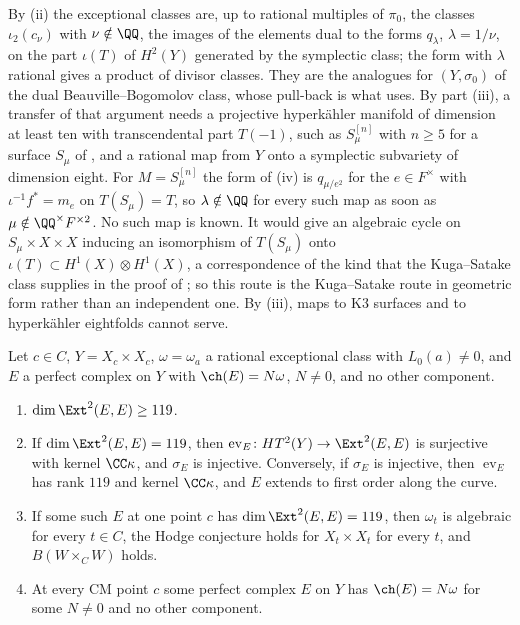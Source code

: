 \begin{remark}\label{rem:hkroute}
By (ii) the exceptional classes are, up to rational
multiples of $\pi_{0}$, the classes $\iota_{2}(c_{\nu})$ with $\nu\notin\QQ$,
the images of the elements dual to the forms $q_{\lambda}$, $\lambda=1/\nu$,
on the part $\iota(T)$ of $H^{2}(Y)$ generated by the symplectic class; the
form with $\lambda$ rational gives a product of divisor classes. They are the
analogues for $(Y,\sigma_{0})$ of the dual Beauville--Bogomolov class, whose
pull-back is what \cite{vGR26} uses. By part (iii), a transfer of that
argument needs a projective hyperk\"ahler manifold of dimension at least ten with
transcendental part $T(-1)$, such as $S_{\mu}^{[n]}$ with $n\ge5$ for a
surface $S_{\mu}$ of , and a rational map from $Y$ onto a
symplectic subvariety of dimension eight. For $M=S_{\mu}^{[n]}$ the form of
(iv) is $q_{\mu/e^{2}}$ for the $e\in F^{\times}$ with $\iota^{-1}f^{*}=m_{e}$
on $T(S_{\mu})=T$, so $\lambda\notin\QQ$ for every such map as soon as
$\mu\notin\QQ^{\times}F^{\times2}$. No such map is known. It would give an
algebraic cycle on $S_{\mu}\times X\times X$ inducing an isomorphism of
$T(S_{\mu})$ onto $\iota(T)\subset H^{1}(X)\otimes H^{1}(X)$, a correspondence
of the kind that the Kuga--Satake class supplies in the proof of
; so this route is the Kuga--Satake route in geometric
form rather than an independent one. By (iii), maps to K3 surfaces and to
hyperk\"ahler eightfolds cannot serve.
\end{remark}

\begin{theorem}
\label{thm:mumfordnumerical}
Let $c\in C$, $Y=X_{c}\times X_{c}$, $\omega=\omega_{a}$ a rational
exceptional class with $L_{0}(a)\ne0$, and $E$ a perfect complex on $Y$ with
$\ch(E)=N\omega$, $N\ne0$, and no other component.
\begin{enumerate}[label=\textup{(\roman*)},leftmargin=2.6em,itemsep=2pt]
\item $\dim\Ext^{2}(E,E)\ge119$.
\item If $\dim\Ext^{2}(E,E)=119$, then $\operatorname{ev}_{E}\colon
  HT^{2}(Y)\to\Ext^{2}(E,E)$ is surjective with kernel $\CC\kappa$, and
  $\sigma_{E}$ is injective. Conversely, if $\sigma_{E}$ is injective, then
  $\operatorname{ev}_{E}$ has rank $119$ and kernel $\CC\kappa$, and $E$
  extends to first order along the curve.
\item If some such $E$ at one point $c$ has $\dim\Ext^{2}(E,E)=119$, then
  $\omega_{t}$ is algebraic for every $t\in C$, the Hodge conjecture holds for
  $X_{t}\times X_{t}$ for every $t$, and $B(W\times_{C}W)$ holds.
\item At every CM point $c$ some perfect complex $E$ on $Y$ has
  $\ch(E)=N\omega$ for some $N\ne0$ and no other component.
\end{enumerate}
\end{theorem}

